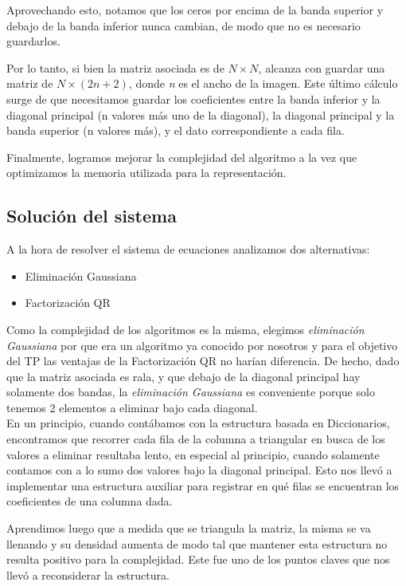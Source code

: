 \documentclass[a4paper]{article}
\begin{document}
Aprovechando esto, notamos que los ceros por encima de la banda superior y debajo de la banda inferior nunca cambian, de modo que no es necesario guardarlos. \vspace{1em}

Por lo tanto, si bien la matriz asociada es de $N \times N$, alcanza con guardar una matriz de $N \times (2n + 2)$, donde \textit{n} es el ancho de la imagen. Este último cálculo surge de que necesitamos guardar los coeficientes entre la banda inferior y la diagonal principal (n valores más uno de la diagonal), la diagonal principal y la banda superior (n valores más), y el dato correspondiente a cada fila.

Finalmente, logramos mejorar la complejidad del algoritmo a la vez que optimizamos la memoria utilizada para la representación.

\subsection{Solución del sistema}

A la hora de resolver el sistema de ecuaciones analizamos dos alternativas:
\begin{itemize}
	\item Eliminación Gaussiana
	\item Factorización QR
\end{itemize}

\vspace{2em}
Como la complejidad de los algoritmos es la misma, elegimos \textit{eliminación Gaussiana} por que era un algoritmo ya conocido por nosotros y para el objetivo del TP las ventajas de la Factorización QR no harían diferencia. 
De hecho, dado que la matriz asociada es rala, y que debajo de la diagonal principal hay solamente dos bandas, la \textit{eliminación Gaussiana} es conveniente porque solo tenemos 2 elementos a eliminar bajo cada diagonal. \\ 


En un principio, cuando contábamos con la estructura basada en Diccionarios, encontramos que recorrer cada fila de la columna a triangular en busca de los valores a eliminar resultaba lento, en especial al principio, cuando solamente contamos con a lo sumo dos valores bajo la diagonal principal. Esto nos llevó a implementar una estructura auxiliar para registrar en qué filas se encuentran los coeficientes de una columna dada.

Aprendimos luego que a medida que se triangula la matriz, la misma se va llenando y su densidad aumenta de modo tal que mantener esta estructura no resulta positivo para la complejidad. Este fue uno de los puntos claves que nos llevó a reconsiderar la estructura.
\end{document}
